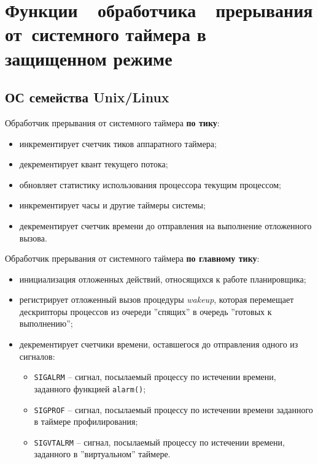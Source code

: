 \chapter{Функции~~обработчика~~прерывания от~системного
таймера в защищенном режиме}

\section{ОС семейства Unix/Linux}

Обработчик прерывания от системного таймера \textbf{по тику}:
\begin{itemize}[left=\parindent]
    \item инкрементирует счетчик тиков аппаратного таймера;
    \item декрементирует квант текущего потока;
    \item обновляет статистику использования процессора текущим процессом;
    \item инкрементирует часы и другие таймеры системы; 
    \item декрементирует счетчик времени до отправления на выполнение
          отложенного вызова.
\end{itemize}

Обработчик прерывания от системного таймера \textbf{по главному тику}:
\begin{itemize}[left=\parindent]
    \item инициализация отложенных действий, относящихся к работе планировщика;
    \item регистрирует отложенный вызов процедуры \textit{wakeup}, которая
          перемещает дескрипторы процессов из очереди ''спящих'' в очередь
          ''готовых к выполнению'';
    \item декрементирует счетчики времени, оставшегося до отправления одного из
          сигналов:
    \begin{itemize}[left=\parindent]
        \item \texttt{SIGALRM} -- сигнал, посылаемый процессу по истечении
              времени, заданного функцией \texttt{alarm()};
        \item \texttt{SIGPROF} -- сигнал, посылаемый процессу по истечении
              времени заданного в таймере профилирования;
        \item \texttt{SIGVTALRM} -- сигнал, посылаемый процессу по истечении
              времени, заданного в ''виртуальном'' таймере.
    \end{itemize}
\end{itemize}

